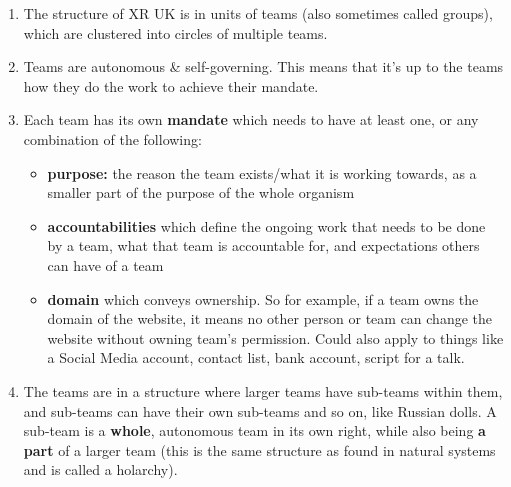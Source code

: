 \documentclass[12pt,a4paper,oneside]{article}
\begin{document}
\begin{enumerate}
\item
  The structure of XR UK is in units of teams (also sometimes called groups),
  which are clustered into circles of multiple teams.

\item
  Teams are autonomous \& self-governing. This means that it’s up to the teams
  how they do the work to achieve their mandate.

\item
  Each team has its own \textbf{mandate} which needs to have at least one, or
  any combination of the following:
  \begin{itemize}
  \item
    \textbf{purpose:} the reason the team exists/what it is working towards, as
    a smaller part of the purpose of the whole organism

  \item
    \textbf{accountabilities} which define the ongoing work that needs to be
    done by a team, what that team is accountable for, and expectations others
    can have of a team

  \item
    \textbf{domain} which conveys ownership. So for example, if a team owns the
    domain of the website, it means no other person or team can change the
    website without owning team’s permission. Could also apply to things like a
    Social Media account, contact list, bank account, script for a talk.
  \end{itemize}

\item
  The teams are in a structure where larger teams have sub-teams within them,
  and sub-teams can have their own sub-teams and so on, like Russian dolls. A
  sub-team is a \textbf{whole}, autonomous team in its own right, while also
  being \textbf{a part} of a larger team (this is the same structure as found in
  natural systems and is called a holarchy).


\end{enumerate}
\end{document}
